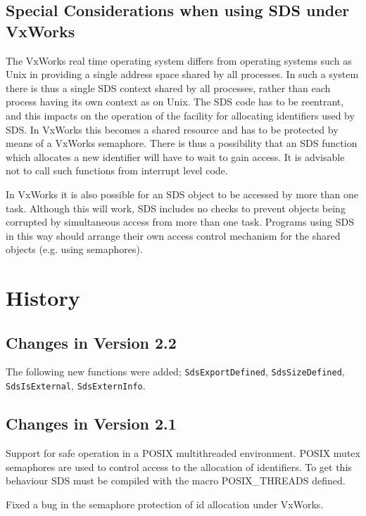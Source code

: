 \subsection{Special Considerations when using SDS under VxWorks}

The VxWorks real time operating system differs from operating systems such as
Unix in providing a single address space shared by all processes. In such a
system there is thus a single SDS context shared by all processes, rather than
each process having its own context as on Unix. The SDS code has to be
reentrant, and this impacts on the operation of the facility for allocating
identifiers used by SDS. In VxWorks this becomes a shared resource and has to
be protected by means of a VxWorks semaphore. There is thus a possibility that 
an SDS function which allocates a new identifier will have to wait to gain
access. It is advisable not to call such functions from interrupt level code.

In VxWorks it is also possible for an SDS object to be accessed by more than
one task. Although this will work, SDS includes no checks to prevent objects
being corrupted by simultaneous access from more than one task. Programs using
SDS in this way should arrange their own access control mechanism for the shared
objects  (e.g. using semaphores).

\section{History}

\subsection{Changes in Version 2.2}

The following new functions were added; \verb$SdsExportDefined$,
\verb$SdsSizeDefined$, \verb$SdsIsExternal$, \verb$SdsExternInfo$.



\subsection{Changes in Version 2.1}

Support for safe operation in a POSIX multithreaded environment. POSIX
mutex semaphores are used to control access to the allocation of identifiers.
To get this behaviour SDS must be compiled with the macro POSIX\_THREADS
defined.

Fixed a bug in the semaphore protection of id allocation under VxWorks.


